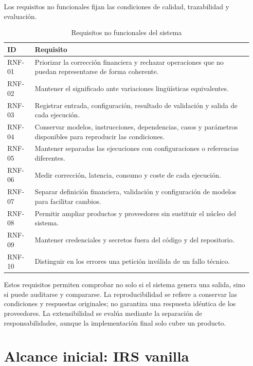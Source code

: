 Los requisitos no funcionales fijan las condiciones de calidad, trazabilidad y evaluación.

\begin{table}[H]
\centering
\small
\caption{Requisitos no funcionales del sistema}
\label{tab:requisitos_no_funcionales}
\begin{tabular}{|P{1.8cm}|P{11.8cm}|}
\hline
\textbf{ID} & \textbf{Requisito} \\
\hline
RNF-01 & Priorizar la corrección financiera y rechazar operaciones que no puedan representarse de forma coherente. \\
\hline
RNF-02 & Mantener el significado ante variaciones lingüísticas equivalentes. \\
\hline
RNF-03 & Registrar entrada, configuración, resultado de validación y salida de cada ejecución. \\
\hline
RNF-04 & Conservar modelos, instrucciones, dependencias, casos y parámetros disponibles para reproducir las condiciones. \\
\hline
RNF-05 & Mantener separadas las ejecuciones con configuraciones o referencias diferentes. \\
\hline
RNF-06 & Medir corrección, latencia, consumo y coste de cada ejecución. \\
\hline
RNF-07 & Separar definición financiera, validación y configuración de modelos para facilitar cambios. \\
\hline
RNF-08 & Permitir ampliar productos y proveedores sin sustituir el núcleo del sistema. \\
\hline
RNF-09 & Mantener credenciales y secretos fuera del código y del repositorio. \\
\hline
RNF-10 & Distinguir en los errores una petición inválida de un fallo técnico. \\
\hline
\end{tabular}
\end{table}

Estos requisitos permiten comprobar no solo si el sistema genera una salida, sino si puede auditarse y compararse. La reproducibilidad se refiere a conservar las condiciones y respuestas originales; no garantiza una respuesta idéntica de los proveedores. La extensibilidad se evalúa mediante la separación de responsabilidades, aunque la implementación final solo cubre un producto.

\section{Alcance inicial: IRS vanilla}
\label{sec:alcance_inicial}

